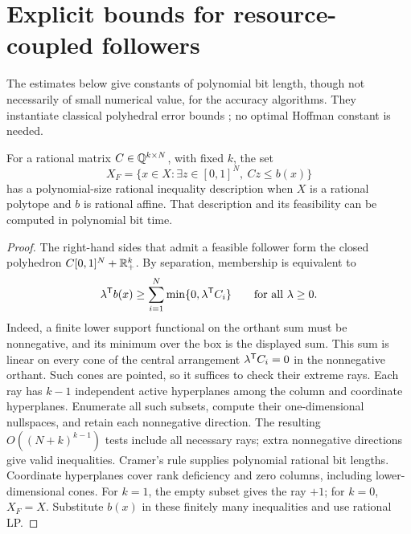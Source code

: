 \section{Explicit bounds for resource-coupled followers}
\label{app:quantitative}

The estimates below give constants of polynomial bit length, though not
necessarily of small numerical value, for the accuracy algorithms. They
instantiate classical polyhedral error bounds \cite{Hoffman1952}; no optimal
Hoffman constant is needed.

\begin{lemma}\label{lem:resource-projection}
For a rational matrix $C\in\mathbb Q^{k\times N}$, with fixed $k$, the set
\[
 X_F=\{x\in X:\exists z\in[0,1]^N,\ Cz\le b(x)\}
\]
has a polynomial-size rational inequality description when $X$ is a
rational polytope and $b$ is rational affine. That description and its
feasibility can be computed in polynomial bit time.
\end{lemma}
\begin{proof}
The right-hand sides that admit a feasible follower form the closed
polyhedron $C[0,1]^N+\mathbb R_+^k$. By separation, membership is equivalent to
\begin{equation}\label{eq:resource-support}
 \lambda^{\mathsf T} b(x)\ge\sum_{i=1}^N\min\{0,\lambda^{\mathsf T} C_i\}
                              \qquad\text{for all }\lambda\ge0.
\end{equation}
Indeed, a finite lower support functional on the orthant sum must be
nonnegative, and its minimum over the box is the displayed sum. This sum is
linear on every cone of the central arrangement $\lambda^{\mathsf T} C_i=0$ in
the nonnegative orthant. Such cones are pointed, so it suffices to check
their extreme rays. Each ray has $k-1$ independent active hyperplanes among
the column and coordinate hyperplanes. Enumerate all such subsets, compute
their one-dimensional nullspaces, and retain each nonnegative direction.
The resulting $O((N+k)^{k-1})$ tests include all necessary rays; extra
nonnegative directions give valid inequalities. Cramer's rule supplies polynomial
rational bit lengths. Coordinate hyperplanes cover rank deficiency and
zero columns, including lower-dimensional cones. For $k=1$, the empty
subset gives the ray $+1$; for $k=0$, $X_F=X$. Substitute $b(x)$
in these finitely many inequalities and use rational LP.
\end{proof}

